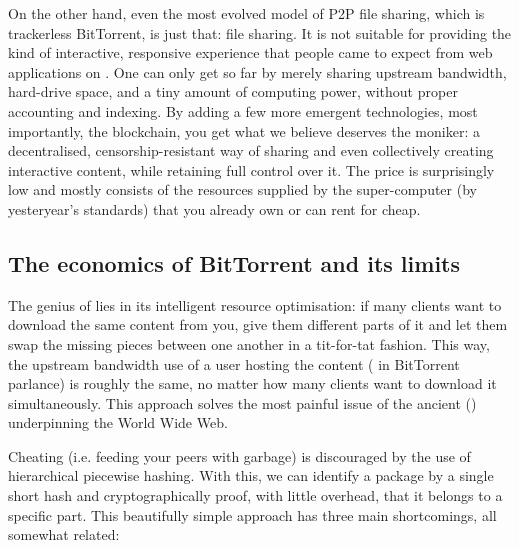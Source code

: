 On the other hand, even the most evolved model of P2P file sharing, which is trackerless BitTorrent, is just that: file sharing. It is not suitable for providing the kind of interactive, responsive experience that people came to expect from web applications on . One can only get so far by merely sharing upstream bandwidth, hard-drive space, and a tiny amount of computing power, without proper accounting and indexing. By adding a few more emergent technologies, most importantly, the blockchain, you get what we believe deserves the  moniker: a decentralised, censorship-resistant way of sharing and even collectively creating interactive content, while retaining full control over it. The price is surprisingly low and mostly consists of the resources supplied by the super-computer (by yesteryear's standards) that you already own or can rent for cheap.

\subsection{The economics of BitTorrent and its limits}

The genius of  lies in its intelligent resource optimisation: if many clients want to download the same content from you, give them different parts of it and let them swap the missing pieces between one another in a tit-for-tat fashion. This way, the upstream bandwidth use of a user hosting the content ( in BitTorrent parlance) is roughly the same, no matter how many clients want to download it simultaneously. This approach solves the most painful issue of the ancient  () underpinning the World Wide Web.

Cheating (i.e. feeding your peers with garbage) is discouraged by the use of hierarchical piecewise hashing. With this, we can identify a package by a single short hash and cryptographically proof, with little overhead, that it belongs to a specific part. This beautifully simple approach has three main shortcomings, all somewhat related:

